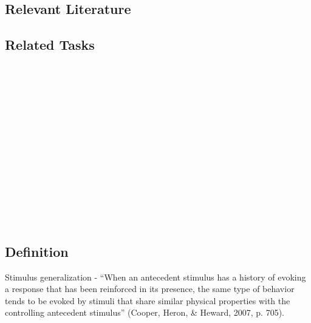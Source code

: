 \subsection{Relevant Literature}
\begin{refsection}
\nocite{test,alang2017police,clayton2018black}
\printbibliography[heading=none]
\end{refsection}
%
\subsection{Related Tasks}
\fourbOne{}\\
\foureSix{}\\
\foureEleven{}\\
\fouriOne{}\\
\fouriTwo{}\\
\fourjEleven{}\\
\fourjTwelve{}\\
\fourjFourteen{}\\
\fourkNine{}\\
\fourFKTen{}\\
\fourFKEleven{}\\
\fourFKTwelve{}\\
\fourFKThirtySeven{}\\
%
%
%
%
%
%
%
%
%
\section{\fourFKThirtySeven{}}
\subsection{Definition} 
Stimulus generalization - ``When an antecedent stimulus has a history of evoking a response that has been reinforced in its presence, the same type of behavior tends to be evoked by stimuli that share similar physical properties with the controlling antecedent stimulus'' (Cooper, Heron, \& Heward, 2007, p. 705).
%
